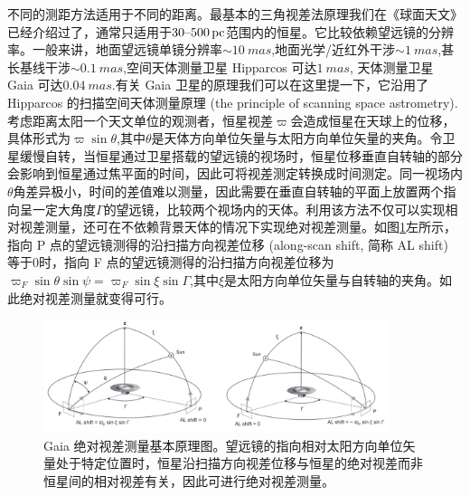 \documentclass[../天体物理基础.tex]{subfiles}
\begin{document}
不同的测距方法适用于不同的距离。最基本的三角视差法原理我们在《球面天文》已经介绍过了，通常只适用于$30\text{\textendash}500\,\unit{pc}$范围内的恒星。它比较依赖望远镜的分辨率。一般来讲，地面望远镜单镜分辨率$\sim\qty{10}{mas}$,地面光学/近红外干涉$\sim\qty{1}{mas}$,甚长基线干涉$\sim\qty{0.1}{mas}$,空间天体测量卫星 Hipparcos 可达$\qty{1}{mas}$, 天体测量卫星 Gaia 可达$\qty{0.04}{mas}$.有关 Gaia 卫星的原理我们可以在这里提一下，它沿用了 Hipparcos 的扫描空间天体测量原理 (the principle of scanning space astrometry).考虑距离太阳一个天文单位的观测者，恒星视差$\varpi$会造成恒星在天球上的位移，具体形式为$\varpi\sin\theta$,其中$\theta$是天体方向单位矢量与太阳方向单位矢量的夹角。令卫星缓慢自转，当恒星通过卫星搭载的望远镜的视场时，恒星位移垂直自转轴的部分会影响到恒星通过焦平面的时间，因此可将视差测定转换成时间测定。同一视场内$\theta$角差异极小，时间的差值难以测量，因此需要在垂直自转轴的平面上放置两个指向呈一定大角度$\Gamma$的望远镜，比较两个视场内的天体。利用该方法不仅可以实现相对视差测量，还可在不依赖背景天体的情况下实现绝对视差测量。如图\ref{absolute_parallax}左所示，指向 P 点的望远镜测得的沿扫描方向视差位移 (along-scan shift, 简称 AL shift) 等于$0$时，指向 F 点的望远镜测得的沿扫描方向视差位移为$\varpi_{F}\sin\theta\sin\psi=\varpi_{F}\sin\xi\sin\Gamma$,其中$\xi$是太阳方向单位矢量与自转轴的夹角。如此绝对视差测量就变得可行。
\begin{figure}[!htp]
\centering
\includegraphics[width=0.9\textwidth]{figures/figure1_19.png}
\captionsetup{justification=raggedright, singlelinecheck=false}
\caption{Gaia 绝对视差测量基本原理图。望远镜的指向相对太阳方向单位矢量处于特定位置时，恒星沿扫描方向视差位移与恒星的绝对视差而非恒星间的相对视差有关，因此可进行绝对视差测量。}
\label{absolute_parallax}
\end{figure}
\end{document}
